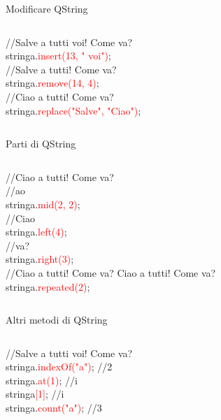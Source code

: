 \documentclass{beamer}
\begin{document}
\begin{frame}{Modificare QString}
	\begin{columns}
		\begin{block}{}
			{\ttfamily //Salve a tutti voi! Come va?\\
				stringa.\textcolor{red}{insert(13, " voi")};\\
				\bigskip
				//Salve a tutti! Come va?\\
				stringa.\textcolor{red}{remove(14, 4)};\\
				\bigskip
				//Ciao a tutti! Come va?\\
				stringa.\textcolor{red}{replace("Salve", "Ciao")};}
		\end{block}
	\end{columns}
\end{frame}

\begin{frame}{Parti di QString}
	\begin{columns}
		\column{0.9\textwidth}
		\begin{block}{}
			{\ttfamily //Ciao a tutti! Come va?\\
				\bigskip
				//ao\\
				stringa.\textcolor{red}{mid(2, 2)};\\
				\bigskip
				//Ciao\\
				stringa.\textcolor{red}{left(4)};\\
				\bigskip
				//va?\\
				stringa.\textcolor{red}{right(3)};\\
				\bigskip
				//Ciao a tutti! Come va? Ciao a tutti! Come va?\\
				stringa.\textcolor{red}{repeated(2)};}
		\end{block}
	\end{columns}
\end{frame}

\begin{frame}{Altri metodi di QString}
	\begin{columns}
		\column{0.7\textwidth}
		\begin{block}{}
			{\ttfamily //Salve a tutti voi! Come va?\\
				\bigskip
				stringa.\textcolor{red}{indexOf("a")}; //2\\
				\bigskip
				stringa.\textcolor{red}{at(1)}; //i\\
				\bigskip
				stringa\textcolor{red}{[1]}; //i\\
				\bigskip
				stringa.\textcolor{red}{count("a")}; //3}
		\end{block}
	\end{columns}
\end{frame}
\end{document}
